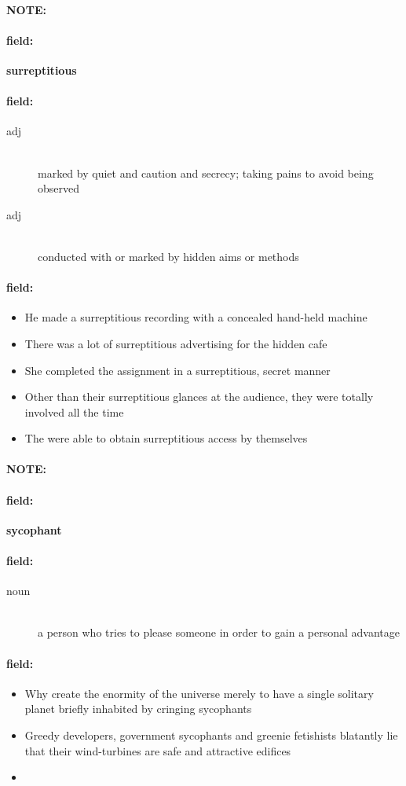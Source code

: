 \documentclass[12pt]{article}
\newenvironment{note}{\paragraph{NOTE:}}{}
\newenvironment{field}{\paragraph{field:}}{}
\begin{document}
\begin{note}
\begin{field}
\textbf{\large surreptitious}
\end{field}


\begin{field}
\begin{description}
\item[adj] \hfill \\ 
marked by quiet and caution and secrecy; taking pains to avoid being observed

\item[adj] \hfill \\ 
conducted with or marked by hidden aims or methods

\end{description}
\end{field}

\begin{field}
\begin{itemize}
\item He made a surreptitious recording with a concealed hand-held machine
\item There was a lot of surreptitious advertising for the hidden cafe
\item She completed the assignment in a surreptitious, secret manner
\item Other than their surreptitious glances at the audience, they were totally involved all the time
\item The were able to obtain surreptitious access by themselves
\end{itemize}
\end{field}
\end{note}
\begin{note}
\begin{field}
\textbf{\large sycophant}
\end{field}


\begin{field}
\begin{description}
\item[noun] \hfill \\ 
a person who tries to please someone in order to gain a personal advantage

\end{description}
\end{field}

\begin{field}
\begin{itemize}
\item Why create the enormity of the universe merely to have a single solitary planet briefly inhabited by cringing sycophants
\item Greedy developers, government sycophants and greenie fetishists blatantly lie that their wind-turbines are safe and attractive edifices
\item 
\end{itemize}
\end{field}
\end{note}
\end{document}
